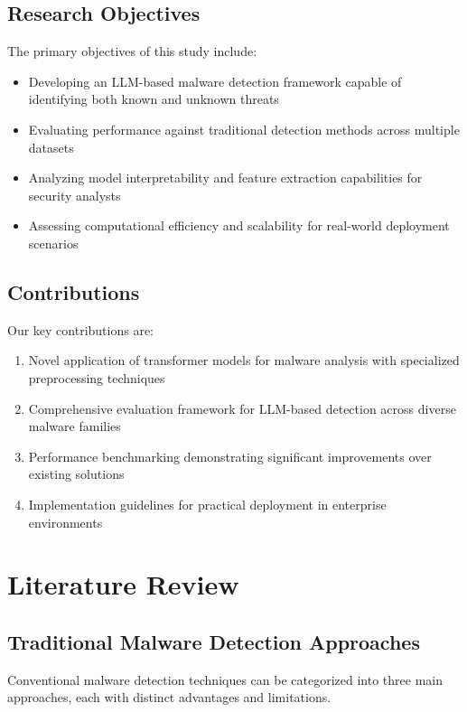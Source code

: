 \documentclass[12pt,a4paper]{article}
\begin{document}
\subsection{Research Objectives}

The primary objectives of this study include:
\begin{itemize}
    \item Developing an LLM-based malware detection framework capable of identifying both
          known and unknown threats
    \item Evaluating performance against traditional detection methods across multiple
          datasets
    \item Analyzing model interpretability and feature extraction capabilities for
          security analysts
    \item Assessing computational efficiency and scalability for real-world deployment
          scenarios
\end{itemize}

\subsection{Contributions}

Our key contributions are:
\begin{enumerate}
    \item Novel application of transformer models for malware analysis with specialized
          preprocessing techniques
    \item Comprehensive evaluation framework for LLM-based detection across diverse
          malware families
    \item Performance benchmarking demonstrating significant improvements over existing
          solutions
    \item Implementation guidelines for practical deployment in enterprise environments
\end{enumerate}

\section{Literature Review}

\subsection{Traditional Malware Detection Approaches}

Conventional malware detection techniques can be categorized into three main
approaches, each with distinct advantages and limitations.
\end{document}
